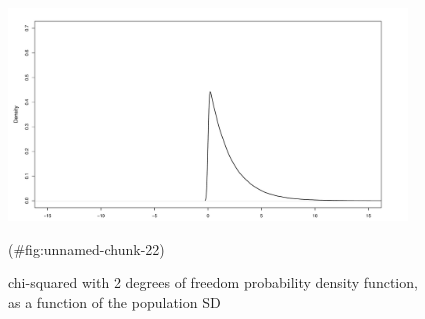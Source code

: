 \begin{appendix}
\begin{figure}
\includegraphics[width=400px]{W-test_files/figure-latex/unnamed-chunk-22-1} \caption{chi-squared with 2 degrees of freedom probability density function, as a function of the population SD}(\#fig:unnamed-chunk-22)
\end{figure}
\end{appendix}
